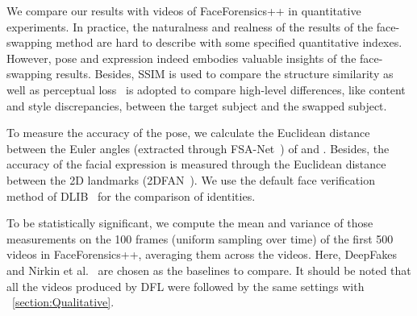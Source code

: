 \documentclass[10pt,twocolumn,letterpaper]{article}
\begin{document}
We compare our results with videos of FaceForensics++ in quantitative experiments. In practice, the naturalness and realness of the results of the face-swapping method are hard to describe with some specified quantitative indexes. However, pose and expression indeed embodies valuable insights of the face-swapping results. Besides, SSIM is used to compare the structure similarity as well as perceptual loss~\cite{johnson2016perceptual} is adopted to compare high-level differences, like content and style discrepancies, between the target subject and the swapped subject.

To measure the accuracy of the pose, we calculate the Euclidean distance between the Euler angles (extracted through FSA-Net~\cite{yang2019fsa}) of  and . Besides, the accuracy of the facial expression is measured through the Euclidean distance between the 2D landmarks (2DFAN~\cite{bulat2017far}). We use the default face verification method of DLIB~\cite{king2009dlib} for the comparison of identities.

To be statistically significant, we compute the mean and variance of those measurements on the 100 frames (uniform sampling over time) of the first 500 videos in FaceForensics++, averaging them across the videos. Here, DeepFakes~\cite{Deepfakes} and Nirkin et al.~\cite{nirkin2018_faceswap} are chosen as the baselines to compare. It should be noted that all the videos produced by DFL were followed by the same settings with ~\ref{section:Qualitative}.



\begin{table*}[th]
	\caption{Quantitative face swapping results on FaceForensics++~\cite{faceforensics} face images.}
	\label{tab:booktabs1}
	\centering
\end{table*}
\end{document}
